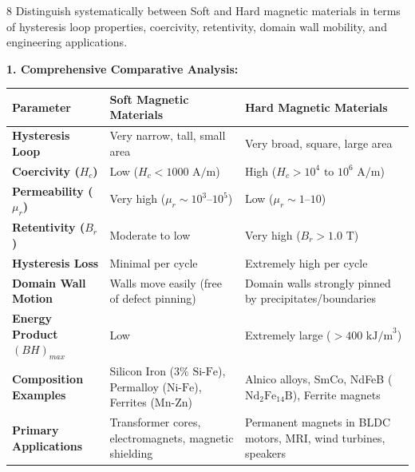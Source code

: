 \vspace{4mm}

\begin{theoryq}{8}
Distinguish systematically between Soft and Hard magnetic materials in terms of hysteresis loop properties, coercivity, retentivity, domain wall mobility, and engineering applications.
\end{theoryq}
\begin{theorysol}
\textbf{1. Comprehensive Comparative Analysis:}
\begin{center}
\begin{tabularx}{\textwidth}{|l|X|X|}
\hline
\textbf{Parameter} & \textbf{Soft Magnetic Materials} & \textbf{Hard Magnetic Materials} \\
\hline
\textbf{Hysteresis Loop} & Very narrow, tall, small area & Very broad, square, large area \\
\textbf{Coercivity ($H_c$)} & Low ($H_c < 1000\text{ A/m}$) & High ($H_c > 10^4\text{ to }10^6\text{ A/m}$) \\
\textbf{Permeability ($\mu_r$)} & Very high ($\mu_r \sim 10^3\text{--}10^5$) & Low ($\mu_r \sim 1\text{--}10$) \\
\textbf{Retentivity ($B_r$)} & Moderate to low & Very high ($B_r > 1.0\text{ T}$) \\
\textbf{Hysteresis Loss} & Minimal per cycle & Extremely high per cycle \\
\textbf{Domain Wall Motion} & Walls move easily (free of defect pinning) & Domain walls strongly pinned by precipitates/boundaries \\
\textbf{Energy Product $(BH)_{max}$} & Low & Extremely large ($>400\text{ kJ/m}^3$) \\
\textbf{Composition Examples} & Silicon Iron ($3\%\text{ Si-Fe}$), Permalloy ($\text{Ni-Fe}$), Ferrites ($\text{Mn-Zn}$) & Alnico alloys, SmCo, NdFeB ($\text{Nd}_2\text{Fe}_{14}\text{B}$), Ferrite magnets \\
\textbf{Primary Applications} & Transformer cores, electromagnets, magnetic shielding & Permanent magnets in BLDC motors, MRI, wind turbines, speakers \\
\hline
\end{tabularx}
\end{center}
\end{theorysol}
\vspace{4mm}

